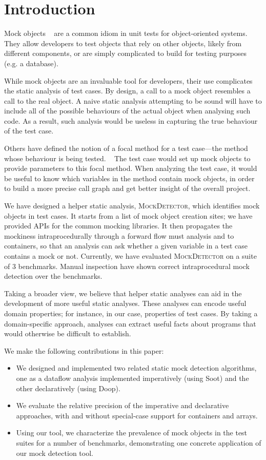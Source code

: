 \section{Introduction}
\label{sec:introduction}

Mock objects ~\cite{beck02:_test_driven_devel} are a common idiom in
unit tests for object-oriented systems.  They allow developers to test objects that 
rely on other objects, likely from different components, or are simply complicated 
to build for testing purposes (e.g. a database).

While mock objects are an invaluable tool for developers, their use
complicates the static analysis of test cases. 
By design, a call to a mock object resembles a call to the real object. 
A naive static analysis attempting to be sound will have to include all of 
the possible behaviours of the actual object when analysing such code. 
As a result, such analysis would be useless in capturing the true behaviour 
of the test case.

Others have defined the notion of a focal method for a test case---the method
whose behaviour is being tested. ~\cite{7335402}
The test case would set up mock objects to provide parameters to this focal method.
When analyzing the test case, it would be useful to know which variables in the
method contain mock objects, in order to build a more precise call graph and get 
better insight of the overall project.

We have designed a helper static analysis, \textsc{MockDetector}, which identifies
mock objects in test cases. It starts from a list of mock object creation sites; we
have provided APIs for the common mocking libraries. It then propagates the mockiness
intraprocedurally through a forward flow must analysis and to containers, so that an analysis
can ask whether a given variable in a test case contains a mock or not. Currently, we have
evaluated \textsc{MockDetector} on a suite of 3 benchmarks. Manual inspection have shown 
correct intraprocedural mock detection over the benchmarks. 

Taking a broader view, we believe that helper static analyses can aid
in the development of more useful static analyses. These analyses can
encode useful domain properties; for instance, in our case, properties
of test cases. By taking a domain-specific approach, analyses can extract
useful facts about programs that would otherwise be difficult to establish.

We make the following contributions in this paper:
\begin{itemize}
\item We designed and implemented two related static mock detection algorithms, one as a dataflow analysis implemented imperatively (using Soot) and the other declaratively (using Doop).
\item We evaluate the relative precision of the imperative and declarative approaches, with and without special-case support for containers and arrays. %
\item Using our tool, we characterize the prevalence of mock objects in the test suites for a number of benchmarks, demonstrating one concrete application of our mock detection tool.
\end{itemize}
